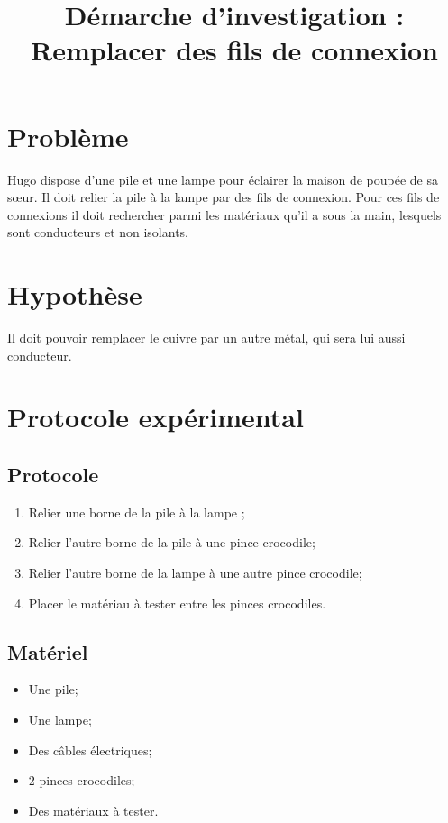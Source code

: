 \documentclass[11pt,a4paper]{article}
\title{Démarche d'investigation : Remplacer des fils de connexion}
\date{}
\begin{document}
	
\maketitle

\vspace*{-2cm}

\section{Problème}	
	Hugo dispose d'une pile et une lampe pour éclairer la maison de poupée de sa s\oe ur. Il doit relier la pile à la lampe par des fils de connexion. Pour ces fils de connexions il doit rechercher parmi les matériaux qu'il a sous la main, lesquels sont conducteurs et non isolants.
	
	
\section{Hypothèse}
	Il doit pouvoir remplacer le cuivre par un autre métal, qui sera lui aussi conducteur.
	
\section{Protocole expérimental}

	\subsection{Protocole}
		\begin{multicols}{2}
			\begin{enumerate}[label=\arabic*)]
						
				\item Relier une borne de la pile à la lampe ;
				\item Relier l'autre borne de la pile à une pince crocodile;
				\item Relier l'autre borne de la lampe à une autre pince crocodile;
				\item Placer le matériau à tester entre les pinces crocodiles.
			\end{enumerate}	
		\end{multicols}
		
	
	\subsection{Matériel}
		\begin{multicols}{2}
			\begin{itemize}
				\item Une pile;
				\item Une lampe;
				\item Des câbles électriques;
				\item 2 pinces crocodiles;
				\item Des matériaux à tester.
			\end{itemize}
		\end{multicols}
\end{document}
